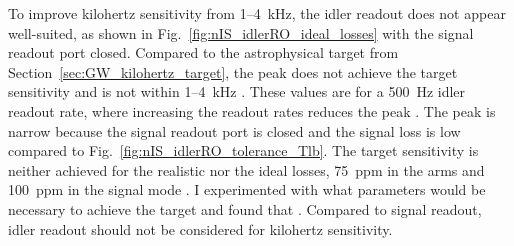 To improve kilohertz sensitivity from 1--4~kHz, the idler readout does not appear well-suited, as shown in Fig.~\ref{fig:nIS_idlerRO_ideal_losses} with the signal readout port closed. Compared to the astrophysical target from Section~\ref{sec:GW_kilohertz_target}, the peak does not achieve the target sensitivity  and is not within 1--4~kHz .  These values are for a 500~Hz idler readout rate, where increasing the readout rates reduces the peak . The peak is narrow because the signal readout port is closed and the signal loss is low compared to Fig.~\ref{fig:nIS_idlerRO_tolerance_Tlb}. The target sensitivity is neither achieved for the realistic nor the ideal losses, 75~ppm in the arms and 100~ppm in the signal mode . I experimented with what parameters would be necessary to achieve the target and found that . Compared to signal readout, idler readout should not be considered for kilohertz sensitivity.

